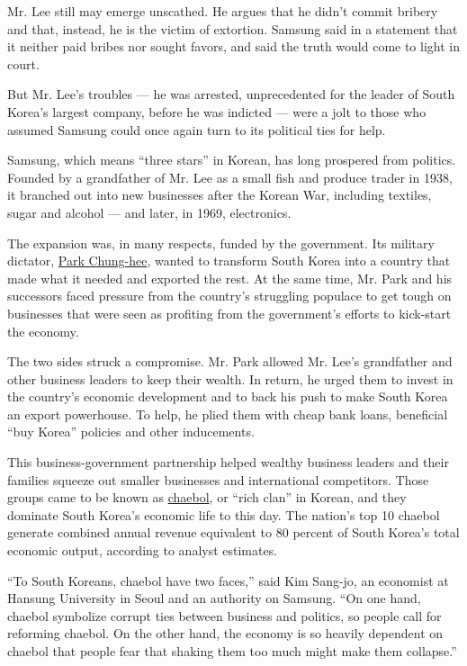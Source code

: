 Mr. Lee still may emerge unscathed. He argues that he didn't commit
bribery and that, instead, he is the victim of extortion. Samsung said
in a statement that it neither paid bribes nor sought favors, and said
the truth would come to light in court.

But Mr. Lee's troubles --- he was arrested, unprecedented for the leader
of South Korea's largest company, before he was indicted --- were a jolt
to those who assumed Samsung could once again turn to its political ties
for help.

Samsung, which means ``three stars'' in Korean, has long prospered from
politics. Founded by a grandfather of Mr. Lee as a small fish and
produce trader in 1938, it branched out into new businesses after the
Korean War, including textiles, sugar and alcohol --- and later, in
1969, electronics.

The expansion was, in many respects, funded by the government. Its
military dictator,
\href{http://www.nytimes3xbfgragh.onion/1995/11/24/world/ruthless-ex-dictator-getting-credit-for-south-korea-s-rise.html}{Park
Chung-hee}, wanted to transform South Korea into a country that made
what it needed and exported the rest. At the same time, Mr. Park and his
successors faced pressure from the country's struggling populace to get
tough on businesses that were seen as profiting from the government's
efforts to kick-start the economy.

The two sides struck a compromise. Mr. Park allowed Mr. Lee's
grandfather and other business leaders to keep their wealth. In return,
he urged them to invest in the country's economic development and to
back his push to make South Korea an export powerhouse. To help, he
plied them with cheap bank loans, beneficial ``buy Korea'' policies and
other inducements.

This business-government partnership helped wealthy business leaders and
their families squeeze out smaller businesses and international
competitors. Those groups came to be known as
\href{https://www.nytimes3xbfgragh.onion/2017/02/17/business/south-korea-chaebol-samsung.html}{chaebol},
or ``rich clan'' in Korean, and they dominate South Korea's economic
life to this day. The nation's top 10 chaebol generate combined annual
revenue equivalent to 80 percent of South Korea's total economic output,
according to analyst estimates.

``To South Koreans, chaebol have two faces,'' said Kim Sang-jo, an
economist at Hansung University in Seoul and an authority on Samsung.
``On one hand, chaebol symbolize corrupt ties between business and
politics, so people call for reforming chaebol. On the other hand, the
economy is so heavily dependent on chaebol that people fear that shaking
them too much might make them collapse.''

